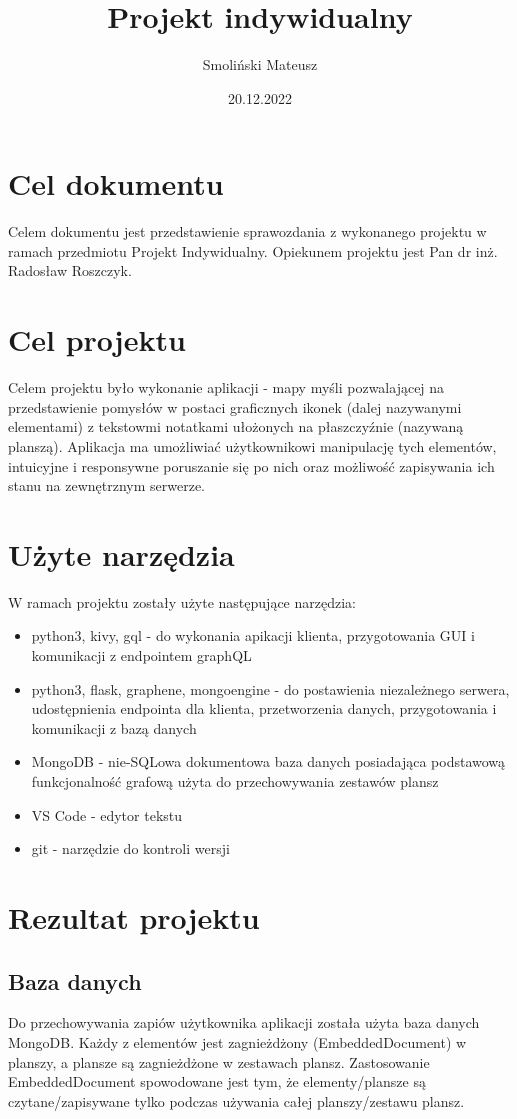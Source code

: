 \documentclass[a4paper,11pt]{article}
\title{Projekt indywidualny}
\author{Smoliński Mateusz}
\date{20.12.2022}
\begin{document}
\maketitle
\thispagestyle{empty}

\section{Cel dokumentu}
Celem dokumentu jest przedstawienie sprawozdania z wykonanego projektu w ramach przedmiotu Projekt Indywidualny. Opiekunem projektu jest Pan dr inż. Radosław Roszczyk.

\section{Cel projektu}
Celem projektu było wykonanie aplikacji - mapy myśli pozwalającej na przedstawienie pomysłów w postaci graficznych ikonek (dalej nazywanymi elementami) z tekstowmi notatkami ułożonych na płaszczyźnie (nazywaną planszą). Aplikacja ma umożliwiać użytkownikowi manipulację tych elementów, intuicyjne i responsywne poruszanie się po nich oraz możliwość zapisywania ich stanu na zewnętrznym serwerze.

\section{Użyte narzędzia}
W ramach projektu zostały użyte następujące narzędzia:
\begin{itemize}
    \item python3, kivy, gql - do wykonania apikacji klienta, przygotowania GUI i komunikacji z endpointem graphQL
    \item python3, flask, graphene, mongoengine - do postawienia niezależnego serwera, udostępnienia endpointa dla klienta, przetworzenia danych, przygotowania i komunikacji z bazą danych
    \item MongoDB - nie-SQLowa dokumentowa baza danych posiadająca podstawową funkcjonalność grafową użyta do przechowywania zestawów plansz
    \item VS Code - edytor tekstu
    \item git - narzędzie do kontroli wersji
\end{itemize}

\section{Rezultat projektu}

\subsection{Baza danych}
Do przechowywania zapiów użytkownika aplikacji została użyta baza danych MongoDB. Każdy z elementów jest zagnieżdżony (EmbeddedDocument) w planszy, a plansze są zagnieżdżone w zestawach plansz. Zastosowanie EmbeddedDocument spowodowane jest tym, że elementy/plansze są czytane/zapisywane tylko podczas używania całej planszy/zestawu plansz.
\end{document}
